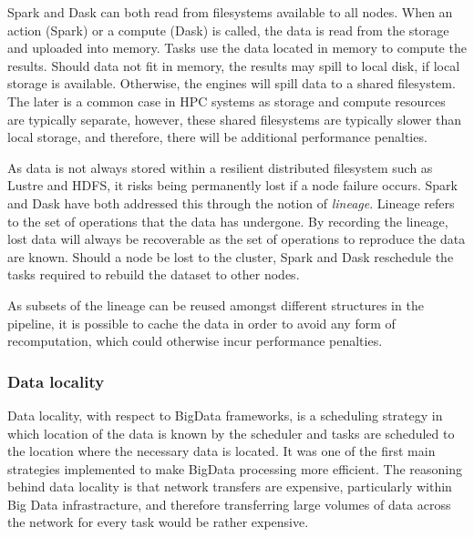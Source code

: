 \documentclass{report}
\begin{document}
                    Spark and Dask can both read from filesystems available to
                    all nodes. When an action (Spark) or a compute (Dask) is 
                    called, the data is read from the storage and uploaded into
                    memory. Tasks use the data located in memory to compute the
                    results. Should data not fit in memory, the results may 
                    spill to local disk, if local storage is available. 
                    Otherwise, the engines will spill data to a shared 
                    filesystem. The later is a common case in HPC systems as 
                    storage and compute resources are typically separate, 
                    however, these shared filesystems are typically slower than 
                    local storage, and therefore, there will be additional 
                    performance penalties.

                    As data is not always stored within a resilient distributed 
                    filesystem such as Lustre and HDFS, it risks being 
                    permanently lost if a node failure occurs. Spark and Dask
                    have both addressed this through the notion of 
                    \textit{lineage}. Lineage refers to the set of operations
                    that the data has undergone. By recording the lineage, lost
                    data will always be recoverable as the set of operations
                    to reproduce the data are known. Should a node be lost to 
                    the cluster, Spark and Dask reschedule the tasks required 
                    to rebuild the dataset to other nodes.

                    As subsets of the lineage can be reused amongst different
                    structures in the pipeline, it is possible to cache the 
                    data in order to avoid any form of recomputation, which 
                    could otherwise incur performance penalties.
                                      
 
                \subsubsection{Data locality}
                    Data locality, with respect to BigData frameworks, is a
                    scheduling
                    strategy in which location of the data is known by the 
                    scheduler and tasks are scheduled to the location where the
                    necessary data is located. It was one of the first main 
                    strategies implemented to make BigData processing more 
                    efficient. The reasoning behind data locality is that 
                    network transfers are expensive, particularly within 
                    Big Data infrastracture, and therefore transferring large 
                    volumes of data across the network for every task would be 
                    rather expensive.
\end{document}
